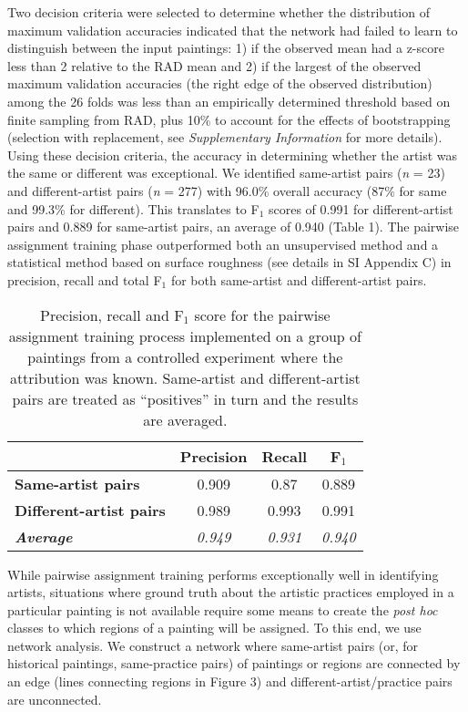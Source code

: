 \documentclass[11pt]{article}
\begin{document}
Two decision criteria were selected to determine whether the
distribution of maximum validation accuracies indicated that the network
had failed to learn to distinguish between the input paintings: 1) if
the observed mean had a z-score less than 2 relative to the RAD mean and
2) if the largest of the observed maximum validation accuracies (the
right edge of the observed distribution) among the 26 folds was less
than an empirically determined threshold based on finite sampling from
RAD, plus 10\% to account for the effects of bootstrapping (selection
with replacement, see \emph{Supplementary Information} for more
details). Using these decision criteria, the accuracy in determining
whether the artist was the same or different was exceptional. We
identified same-artist pairs (\emph{n} = 23) and different-artist pairs
(\emph{n} = 277) with 96.0\% overall accuracy (87\% for same and 99.3\%
for different). This translates to F$_1$ scores of 0.991 for
different-artist pairs and 0.889 for same-artist pairs, an average of
0.940 (Table 1). The pairwise assignment training phase outperformed
both an unsupervised method and a statistical method based on surface
roughness (see details in SI Appendix C) in precision, recall and total
F$_1$ for both same-artist and different-artist pairs.

\begin{table}
\centering
\renewcommand{\arraystretch}{1.05}
\selectfont
\begin{tabular}{|l|c|c|c|} 
\hline
 &\textbf{Precision}&\textbf{Recall} & \textbf{F$_1$}\\
\hline
\textbf{Same-artist pairs}& 0.909 & 0.87 & 0.889\\
\textbf{Different-artist pairs}&0.989&0.993&0.991\\
\textbf{\em Average}&\textit{0.949}&\textit{0.931}&\textit{0.940}\\ 
\hline
\end{tabular}
\caption{Precision, recall and F$_1$ score for the pairwise
assignment training process implemented on a group of paintings from a
controlled experiment where the attribution was known. Same-artist and
different-artist pairs are treated as ``positives'' in turn and the
results are averaged.}
\end{table}

While pairwise assignment training performs exceptionally well in
identifying artists, situations where ground truth about the artistic
practices employed in a particular painting is not available require
some means to create the \emph{post hoc} classes to which regions of a
painting will be assigned. To this end, we use network analysis. We
construct a network where same-artist pairs (or, for historical
paintings, same-practice pairs) of paintings or regions are connected by
an edge (lines connecting regions in Figure 3) and
different-artist/practice pairs are unconnected.
\end{document}
